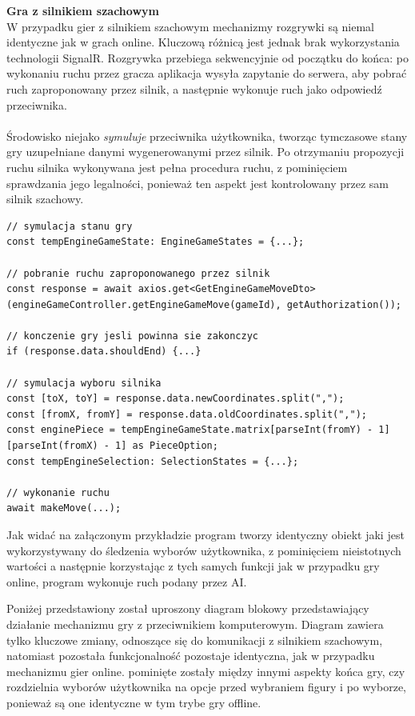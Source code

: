 \documentclass[twoside]{projektInzynierskiMS1}
\begin{document}
\newpage

\noindent \textbf{Gra z silnikiem szachowym}\\
W przypadku gier z silnikiem szachowym mechanizmy rozgrywki są niemal identyczne jak w grach online. Kluczową różnicą jest jednak brak wykorzystania technologii SignalR. Rozgrywka przebiega sekwencyjnie od początku do końca: po wykonaniu ruchu przez gracza aplikacja wysyła zapytanie do serwera, aby pobrać ruch zaproponowany przez silnik, a następnie wykonuje ruch jako odpowiedź przeciwnika.
\\\\
Środowisko niejako \textit{symuluje} przeciwnika użytkownika, tworząc tymczasowe stany gry uzupełniane danymi wygenerowanymi przez silnik. Po otrzymaniu propozycji ruchu silnika wykonywana jest pełna procedura ruchu, z pominięciem sprawdzania jego legalności, ponieważ ten aspekt jest kontrolowany przez sam silnik szachowy.

\vspace{0.5cm}
\begin{lstlisting}[language=JSX]
// symulacja stanu gry
const tempEngineGameState: EngineGameStates = {...};

// pobranie ruchu zaproponowanego przez silnik
const response = await axios.get<GetEngineGameMoveDto>(engineGameController.getEngineGameMove(gameId), getAuthorization());

// konczenie gry jesli powinna sie zakonczyc
if (response.data.shouldEnd) {...}

// symulacja wyboru silnika
const [toX, toY] = response.data.newCoordinates.split(",");
const [fromX, fromY] = response.data.oldCoordinates.split(",");
const enginePiece = tempEngineGameState.matrix[parseInt(fromY) - 1][parseInt(fromX) - 1] as PieceOption;
const tempEngineSelection: SelectionStates = {...};

// wykonanie ruchu
await makeMove(...);
\end{lstlisting}
\vspace{0.5cm}

\noindent
Jak widać na załączonym przykładzie program tworzy identyczny obiekt jaki jest wykorzystywany do śledzenia wyborów użytkownika, z pominięciem nieistotnych wartości a następnie korzystając z tych samych funkcji jak w przypadku gry online, program wykonuje ruch podany przez AI. 

\newpage

\noindent
Poniżej przedstawiony został uproszony diagram blokowy przedstawiający działanie mechanizmu gry z przeciwnikiem komputerowym. Diagram zawiera tylko kluczowe zmiany, odnoszące się do komunikacji z silnikiem szachowym, natomiast pozostała funkcjonalność pozostaje identyczna, jak w przypadku mechanizmu gier online. pominięte zostały między innymi aspekty końca gry, czy rozdzielnia wyborów użytkownika na opcje przed wybraniem figury i po wyborze, ponieważ są one identyczne w tym trybe gry offline.
\end{document}
